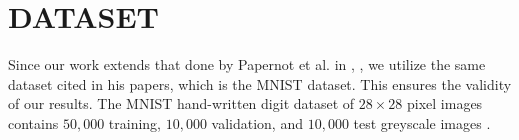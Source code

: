 \section{DATASET}
Since our work extends that done by Papernot et al. in \cite{papernot1}, \cite{papernot3}, we utilize the same dataset cited in his papers, which is the MNIST dataset. This ensures the validity of our results. The MNIST hand-written digit dataset of $28 \times 28$ pixel images contains $50,000$ training, $10,000$ validation, and $10,000$ test greyscale images \cite{mnist}. 


